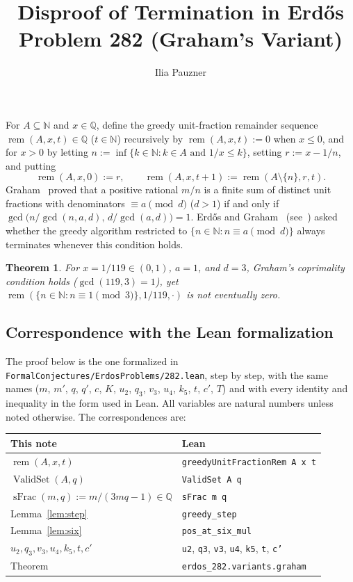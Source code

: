 \documentclass[11pt,a4paper]{amsart}
\title{Disproof of Termination in Erd\H{o}s Problem 282 (Graham's Variant)}
\author{Ilia Pauzner}
\date{}
\newtheorem*{theorem}{Theorem}
\newcommand{\rem}{\operatorname{rem}}
\newcommand{\ValidSet}{\operatorname{ValidSet}}
\newcommand{\sFrac}{\operatorname{sFrac}}
\begin{document}
\maketitle

For $A \subseteq \mathbb{N}$ and $x \in \mathbb{Q}$, define the greedy unit-fraction remainder sequence $\rem(A, x, t) \in \mathbb{Q}$ ($t \in \mathbb{N}$) recursively by $\rem(A, x, t) := 0$ when $x \le 0$, and for $x > 0$ by letting $n := \inf\{k \in \mathbb{N} : k \in A \text{ and } 1 / x \le k\}$, setting $r := x - 1 / n$, and putting
\[
\rem(A, x, 0) := r, \qquad \rem(A, x, t + 1) := \rem(A \setminus \{n\}, r, t).
\]
Graham~\cite{Gr64b} proved that a positive rational $m / n$ is a finite sum of distinct unit fractions with denominators $\equiv a \pmod{d}$ ($d > 1$) if and only if $\gcd\bigl(n / \gcd(n, a, d),\, d / \gcd(a, d)\bigr) = 1$. Erd\H{o}s and Graham~\cite[p.~31]{ErGr80} (see~\cite{EP282, FC282}) asked whether the greedy algorithm restricted to $\{n \in \mathbb{N} : n \equiv a \pmod{d}\}$ always terminates whenever this condition holds.

\begin{theorem}
For $x = 1 / 119 \in (0, 1)$, $a = 1$, and $d = 3$, Graham's coprimality condition holds ($\gcd(119, 3) = 1$), yet $\rem(\{n \in \mathbb{N} : n \equiv 1 \pmod{3}\}, 1 / 119, \cdot)$ is not eventually zero.
\end{theorem}

\subsection*{Correspondence with the Lean formalization}
The proof below is the one formalized in \nolinkurl{FormalConjectures/ErdosProblems/282.lean}, step by step, with the same names ($m$, $m'$, $q$, $q'$, $c$, $K$, $u_2$, $q_3$, $v_3$, $u_4$, $k_5$, $t$, $c'$, $T$) and with every identity and inequality in the form used in Lean. All variables are natural numbers unless noted otherwise. The correspondences are:
\begingroup
\small
\begin{longtable}{@{}>{\raggedright\arraybackslash}p{}>{\raggedright\arraybackslash}p{}@{}}
\hline
This note & Lean \\
\hline
\endhead
$\rem(A, x, t)$ & \texttt{greedyUnitFractionRem A x t} \\
$\ValidSet(A, q)$ & \texttt{ValidSet A q} \\
$\sFrac(m, q) := m / (3 m q - 1) \in \mathbb{Q}$ & \texttt{sFrac m q} \\
Lemma~\ref{lem:step} & \texttt{greedy\_step} \\
Lemma~\ref{lem:six} & \texttt{pos\_at\_six\_mul} \\
$u_2, q_3, v_3, u_4, k_5, t, c'$ & \texttt{u2}, \texttt{q3}, \texttt{v3}, \texttt{u4}, \texttt{k5}, \texttt{t}, \texttt{c'} \\
Theorem & \texttt{erdos\_282.variants.graham} \\
\hline
\end{longtable}
\endgroup
\end{document}
